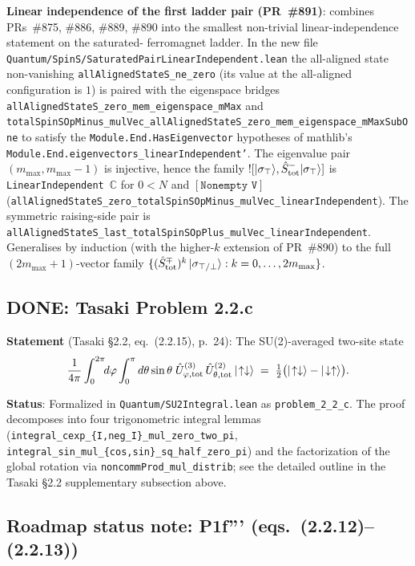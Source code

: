 \documentclass[a4paper,11pt]{article}
\begin{document}
\textbf{Linear independence of the first ladder pair (PR~\#891)}:
combines PRs~\#875, \#886, \#889, \#890 into the smallest
non-trivial linear-independence statement on the saturated-
ferromagnet ladder. In the new file
\texttt{Quantum/SpinS/SaturatedPairLinearIndependent.lean} the
all-aligned state non-vanishing
\texttt{allAlignedStateS\_ne\_zero} (its value at the all-aligned
configuration is $1$) is paired with the eigenspace bridges
\texttt{allAlignedStateS\_zero\_mem\_eigenspace\_mMax} and
\texttt{totalSpinSOpMinus\_mulVec\_allAlignedStateS\_zero\_mem\_eigenspace\_mMaxSubOne}
to satisfy the \texttt{Module.End.HasEigenvector} hypotheses of
mathlib's \texttt{Module.End.eigenvectors\_linearIndependent'}.
The eigenvalue pair $(m_{\max},m_{\max}-1)$ is injective, hence
the family $![|\sigma_\top\rangle,\hat S^-_{\rm tot}|\sigma_\top\rangle]$
is \texttt{LinearIndependent}~$\mathbb{C}$ for $0<N$ and
$[\texttt{Nonempty V}]$
(\texttt{allAlignedStateS\_zero\_totalSpinSOpMinus\_mulVec\_linearIndependent}).
The symmetric raising-side pair is
\texttt{allAlignedStateS\_last\_totalSpinSOpPlus\_mulVec\_linearIndependent}.
Generalises by induction (with the higher-$k$ extension of
PR~\#890) to the full $(2m_{\max}+1)$-vector family
$\{(\hat S^\mp_{\rm tot})^k\,|\sigma_{\top/\bot}\rangle:
 k=0,\ldots,2m_{\max}\}$.

\subsection*{DONE: Tasaki Problem 2.2.c}

\textbf{Statement} (Tasaki §2.2, eq.~(2.2.15), p.~24): The
SU(2)-averaged two-site state
\[
  \frac{1}{4\pi} \int_0^{2\pi}\!\!d\varphi \int_0^\pi d\theta \sin\theta\;
    \hat U^{(3)}_{\varphi,{\rm tot}}\,\hat U^{(2)}_{\theta,{\rm tot}}\,
    |\!\uparrow\downarrow\rangle
  \;=\;
  \tfrac{1}{2}\bigl(|\!\uparrow\downarrow\rangle
                   - |\!\downarrow\uparrow\rangle\bigr).
\]

\textbf{Status}: Formalized in
\texttt{Quantum/SU2Integral.lean} as \texttt{problem\_2\_2\_c}.
The proof decomposes into four trigonometric integral lemmas
(\texttt{integral\_cexp\_\{I,neg\_I\}\_mul\_zero\_two\_pi},
\texttt{integral\_sin\_mul\_\{cos,sin\}\_sq\_half\_zero\_pi}) and the
factorization of the global rotation via
\texttt{noncommProd\_mul\_distrib}; see the detailed outline in the
Tasaki §2.2 supplementary subsection above.

\subsection*{Roadmap status note: P1f''' (eqs.~(2.2.12)--(2.2.13))}
\end{document}
